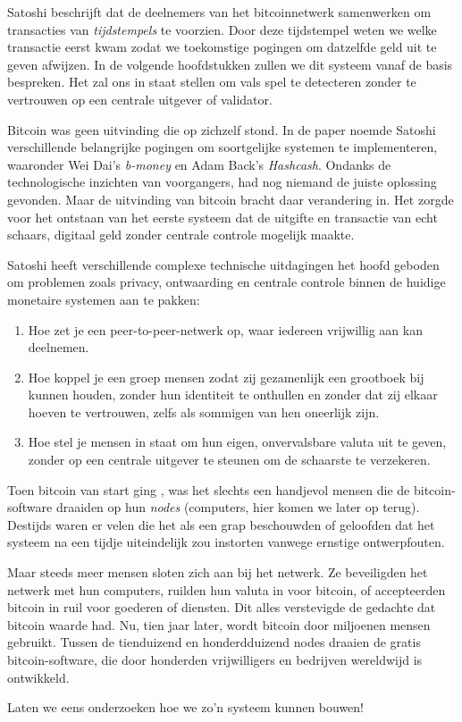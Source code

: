 Satoshi beschrijft dat de deelnemers van het bitcoinnetwerk samenwerken om transacties van \textit{tijdstempels} te voorzien. Door deze tijdstempel weten we welke transactie eerst kwam zodat we toekomstige pogingen om datzelfde geld uit te geven afwijzen. In de volgende hoofdstukken zullen we dit systeem vanaf de basis bespreken. Het zal ons in staat stellen om vals spel te detecteren zonder te vertrouwen op een centrale uitgever of validator.

Bitcoin was geen uitvinding die op zichzelf stond. In de paper noemde Satoshi verschillende belangrijke pogingen om soortgelijke systemen te implementeren, waaronder Wei Dai's \textit{b-money} en Adam Back's \textit{Hashcash}. Ondanks de technologische inzichten van voorgangers, had nog niemand de juiste oplossing gevonden. Maar de uitvinding van bitcoin bracht daar verandering in. Het zorgde voor het ontstaan van het eerste systeem dat de uitgifte en transactie van echt schaars, digitaal geld zonder centrale controle mogelijk maakte.

Satoshi heeft verschillende complexe technische uitdagingen het hoofd geboden om problemen zoals privacy, ontwaarding en centrale controle binnen de huidige monetaire systemen aan te pakken:

\begin{enumerate}
    \item Hoe zet je een peer-to-peer-netwerk op, waar iedereen vrijwillig aan kan deelnemen.
    \item Hoe koppel je een groep mensen zodat zij gezamenlijk een grootboek bij kunnen houden, zonder hun identiteit te onthullen en zonder dat zij elkaar hoeven te vertrouwen, zelfs als sommigen van hen oneerlijk zijn.
    \item Hoe stel je mensen in staat om hun eigen, onvervalsbare valuta uit te geven, zonder op een centrale uitgever te steunen om de schaarste te verzekeren.
\end{enumerate}

Toen bitcoin van start ging , was het slechts een handjevol mensen die de bitcoin-software draaiden op hun \textit{nodes} (computers, hier komen we later op terug). Destijds waren er velen die het als een grap beschouwden of geloofden dat het systeem na een tijdje uiteindelijk zou instorten vanwege ernstige ontwerpfouten.

Maar steeds meer mensen sloten zich aan bij het netwerk. Ze beveiligden het netwerk met hun computers, ruilden hun valuta in voor bitcoin, of accepteerden bitcoin in ruil voor goederen of diensten. Dit alles verstevigde de gedachte dat bitcoin waarde had. Nu, tien jaar later, wordt bitcoin door miljoenen mensen gebruikt. Tussen de tienduizend en honderdduizend nodes draaien de gratis bitcoin-software, die door honderden vrijwilligers en bedrijven wereldwijd is ontwikkeld.

Laten we eens onderzoeken hoe we zo'n systeem kunnen bouwen!
